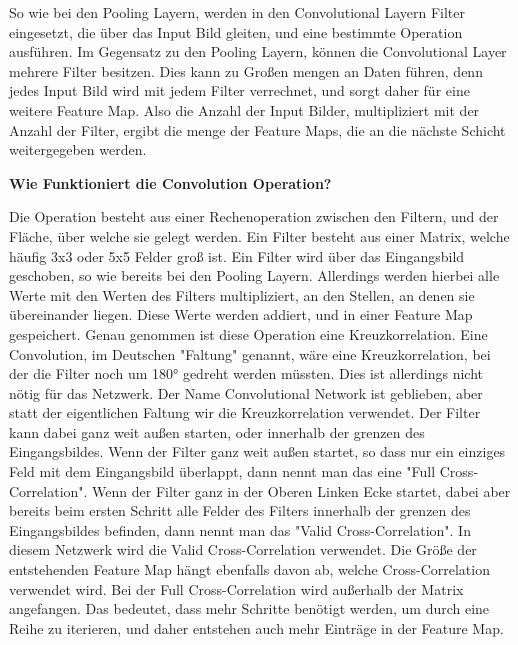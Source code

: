 \documentclass[12pt]{article}
\begin{document}
So wie bei den Pooling Layern, werden in den Convolutional Layern Filter eingesetzt, die über das Input Bild gleiten, und eine bestimmte Operation ausführen. Im Gegensatz zu den Pooling Layern, können die Convolutional Layer mehrere Filter besitzen. Dies kann zu Großen mengen an Daten führen, denn jedes Input Bild wird mit jedem Filter verrechnet, und sorgt daher für eine weitere Feature Map. Also die Anzahl der Input Bilder, multipliziert mit der Anzahl der Filter, ergibt die menge der Feature Maps, die an die nächste Schicht weitergegeben werden.

\textbf{Wie Funktioniert die Convolution Operation?}

Die Operation besteht aus einer Rechenoperation zwischen den Filtern, und der Fläche, über welche sie gelegt werden. Ein Filter besteht aus einer Matrix, welche häufig 3x3 oder 5x5 Felder groß ist. 
Ein Filter wird über das Eingangsbild geschoben, so wie bereits bei den Pooling Layern. Allerdings werden hierbei alle Werte mit den Werten des Filters multipliziert, an den Stellen, an denen sie übereinander liegen. Diese Werte werden addiert, und in einer Feature Map gespeichert.
Genau genommen ist diese Operation eine Kreuzkorrelation. Eine Convolution, im Deutschen "Faltung" genannt, wäre eine Kreuzkorrelation, bei der die Filter noch um 180° gedreht werden müssten. Dies ist allerdings nicht nötig für das Netzwerk. Der Name Convolutional Network ist geblieben, aber statt der eigentlichen Faltung wir die Kreuzkorrelation verwendet.
Der Filter kann dabei ganz weit außen starten, oder innerhalb der grenzen des Eingangsbildes. Wenn der Filter ganz weit außen startet, so dass nur ein einziges Feld mit dem Eingangsbild überlappt, dann nennt man das eine "Full Cross-Correlation". Wenn der Filter ganz in der Oberen Linken Ecke startet, dabei aber bereits beim ersten Schritt alle Felder des Filters innerhalb der grenzen des Eingangsbildes befinden, dann nennt man das "Valid Cross-Correlation".
In diesem Netzwerk wird die Valid Cross-Correlation verwendet. Die Größe der entstehenden Feature Map hängt ebenfalls davon ab, welche Cross-Correlation verwendet wird. 
Bei der Full Cross-Correlation wird außerhalb der Matrix angefangen. Das bedeutet, dass mehr Schritte benötigt werden, um durch eine Reihe zu iterieren, und daher entstehen auch mehr Einträge in der Feature Map.
\end{document}
